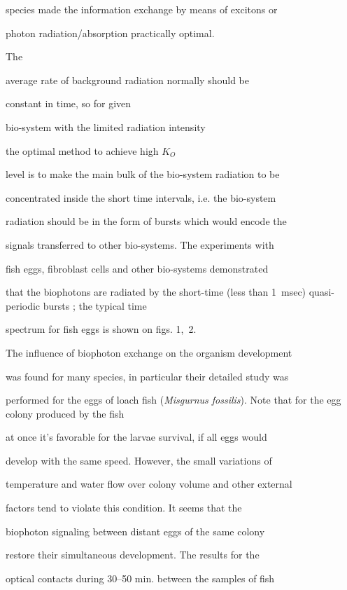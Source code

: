  species made the information exchange by means of excitons  or

 photon radiation/absorption practically optimal.

 The

average rate of background radiation normally should be

 constant in time, so for given

bio-system with the limited  radiation intensity

 the optimal method  to achieve high $K_O$

level is to make the main bulk of the bio-system radiation to be

concentrated inside the short time intervals, i.e. the bio-system

radiation should  be in the form of bursts which would encode the

signals transferred to other bio-systems. The experiments with

fish eggs, fibroblast cells and other bio-systems demonstrated

that the biophotons are radiated by the short-time (less than 1~msec) quasi-periodic bursts \cite {mayb:1, mayb:B4}; the typical time

spectrum for fish eggs is shown on figs. 1,~2.











The influence of biophoton exchange on the organism development

was found for many species, in particular their detailed study was

performed for the eggs of loach fish  ({\it Misgurnus  fossilis}). Note that for the egg colony produced by the fish

at once it's favorable for the larvae survival, if all eggs would

develop with the same speed. However, the small variations of

temperature and water flow over colony volume and other external

factors tend to violate this condition. It seems that the

biophoton signaling between distant eggs  of the same colony

restore their simultaneous development. The results for the

optical contacts during 30--50 min. between the samples of fish

